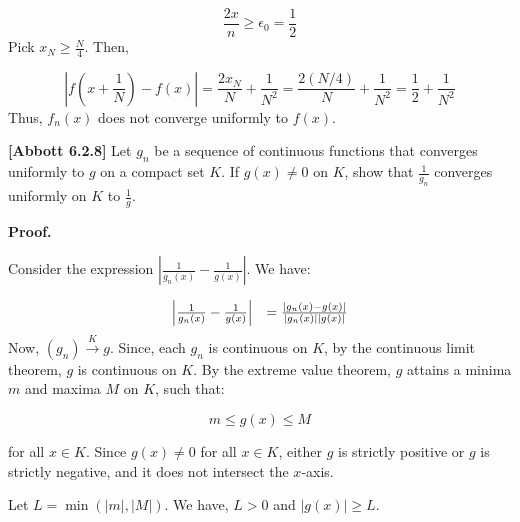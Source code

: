 \documentclass[10pt]{article}
\begin{document}
\begin{equation*}
\frac{2x}{n} \geq \epsilon _{0} =\frac{1}{2}
\end{equation*}
Pick $\displaystyle x_{N} \geq \frac{N}{4}$. Then, 


\begin{equation*}
\left| f\left( x+\frac{1}{N}\right) -f( x)\right| =\frac{2x_{N}}{N} +\frac{1}{N^{2}} =\frac{2( N/4)}{N} +\frac{1}{N^{2}} =\frac{1}{2} +\frac{1}{N^{2}}
\end{equation*}
Thus, $\displaystyle f_{n}( x)$ does not converge uniformly to $\displaystyle f( x)$.



\textbf{[Abbott 6.2.8]} Let $\displaystyle g_{n}$ be a sequence of continuous functions that converges uniformly to $\displaystyle g$ on a compact set $\displaystyle K$. If $\displaystyle g( x) \neq 0$ on $\displaystyle K$, show that $\displaystyle \frac{1}{g_{n}}$ converges uniformly on $\displaystyle K$ to $\displaystyle \frac{1}{g}$.



\textbf{Proof.}



Consider the expression $\displaystyle \left| \frac{1}{g_{n}( x)} -\frac{1}{g( x)}\right| $. We have:


\begin{equation*}
\begin{array}{ c c }
\left| \frac{1}{g_{n}( x)} -\frac{1}{g( x)}\right|  & =\frac{|g_{n}( x) -g( x) |}{|g_{n}( x) ||g( x) |}
\end{array}
\end{equation*}
Now, $\displaystyle ( g_{n})\xrightarrow{K} g$. Since, each $\displaystyle g_{n}$ is continuous on $\displaystyle K$, by the continuous limit theorem, $\displaystyle g$ is continuous on $\displaystyle K$. By the extreme value theorem, $\displaystyle g$ attains a minima $\displaystyle m$ and maxima $\displaystyle M$ on $\displaystyle K$, such that:


\begin{equation*}
m\leq g( x) \leq M
\end{equation*}


for all $\displaystyle x\in K$. Since $\displaystyle g( x) \neq 0$ for all $\displaystyle x\in K$, either $\displaystyle g$ is strictly positive or $\displaystyle g$ is strictly negative, and it does not intersect the $\displaystyle x$-axis.



Let $\displaystyle L=\min( |m|,|M|)$. We have, $\displaystyle L >0$ and $\displaystyle |g( x) |\geq L$. 
\end{document}

